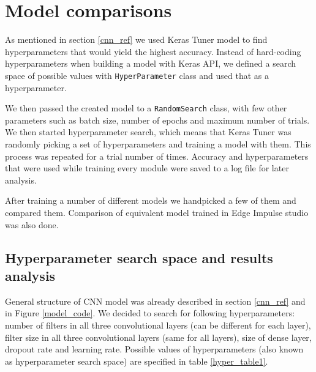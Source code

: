 \section{ Model comparisons}\label{model_comparisons}

As mentioned in section \ref{cnn_ref} we used Keras Tuner model to find hyperparameters that would yield the highest accuracy.
Instead of hard-coding hyperparameters when building a model with Keras API, we defined a search space of possible values with \verb|HyperParameter| class and used that as a hyperparameter.

We then passed the created model to a \verb|RandomSearch| class, with few other parameters such as batch size, number of epochs and maximum number of trials.
We then started hyperparameter search, which means that Keras Tuner was randomly picking a set of hyperparameters and training a model with them. 
This process was repeated for a trial number of times.
Accuracy and hyperparameters that were used while training every module were saved to a log file for later analysis.

After training a number of different models we handpicked a few of them and compared them.
Comparison of equivalent model trained in Edge Impulse studio was also done.


\subsection{ Hyperparameter search space and results analysis}

General structure of CNN model was already described in section \ref{cnn_ref} and in Figure \ref{model_code}.
We decided to search for following hyperparameters: number of filters in all three convolutional layers (can be different for each layer), filter size in all three convolutional layers (same for all layers), size of dense layer, dropout rate and learning rate.
Possible values of hyperparameters (also known as hyperparameter search space) are specified in table \ref{hyper_table1}.

